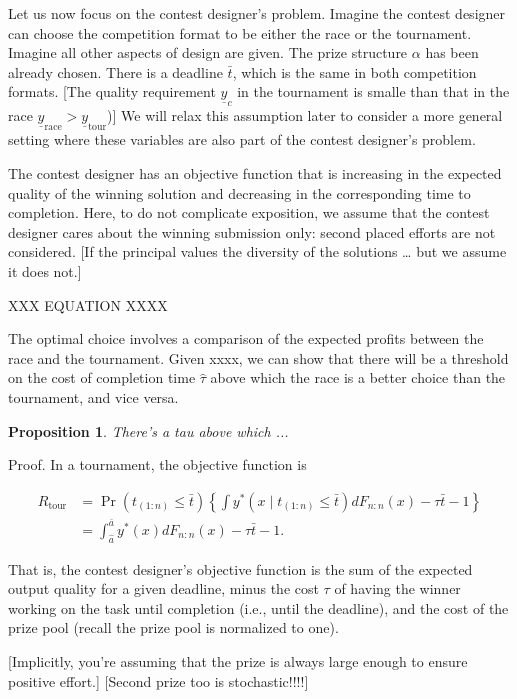 \documentclass[10pt, titlepage]{article}
\newtheorem{proposition}{Proposition}
\newcommand\deadline{\bar{t}}
\newcommand\target{\underline{y}}
\newcommand\race{\text{race}}
\newcommand\tournament{\text{tour}}
\newcommand\mtype{\hat{a}}
\newcommand\hitype{\bar{a}}
\begin{document}
Let us now focus on the contest designer's problem. Imagine the contest
designer can choose the competition format to be either the race or the
tournament. Imagine all other aspects of design are given. The prize
structure \(\alpha\) has been already chosen. There is a deadline
\(\deadline\), which is the same in both competition formats. {[}The
quality requirement \(\target_c\) in the tournament is smalle than that
in the race \(\target_\race > \target_\tournament\)){]} We will relax
this assumption later to consider a more general setting where these
variables are also part of the contest designer's problem.

The contest designer has an objective function that is increasing in the
expected quality of the winning solution and decreasing in the
corresponding time to completion. Here, to do not complicate exposition,
we assume that the contest designer cares about the winning submission
only: second placed efforts are not considered. {[}If the principal
values the diversity of the solutions \ldots{} but we assume it does
not.{]}

XXX EQUATION XXXX

The optimal choice involves a comparison of the expected profits between
the race and the tournament. Given xxxx, we can show that there will be
a threshold on the cost of completion time \(\hat\tau\) above which the
race is a better choice than the tournament, and vice versa.

\begin{proposition}
There's a tau above which ... 
\end{proposition}

Proof. In a tournament, the objective function is

\begin{align}
R_\tournament & = \Pr(t_{(1:n)}\leq \deadline) \left\{\int y^*(x \mid t_{(1:n)}\leq \deadline) dF_{n:n}(x) - \tau \deadline - 1 \right\}  \nonumber\\
  & = \int_{\mtype}^{\hitype} y^*(x) dF_{n:n}(x) - \tau \deadline - 1. 
\end{align}

That is, the contest designer's objective function is the sum of the
expected output quality for a given deadline, minus the cost \(\tau\) of
having the winner working on the task until completion (i.e., until the
deadline), and the cost of the prize pool (recall the prize pool is
normalized to one).

{[}Implicitly, you're assuming that the prize is always large enough to
ensure positive effort.{]} {[}Second prize too is stochastic!!!!{]}
\end{document}
